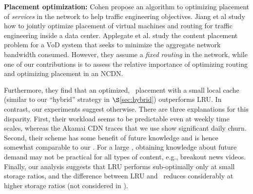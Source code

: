 
\textbf{Placement optimization:} Cohen \cite{serviceplacement} propose an algorithm to optimizing placement of  \emph{services} in the network to help traffic engineering objectives. Jiang et al \cite{vmrouting} study how to jointly optimize placement of virtual machines and routing for traffic engineering inside a data center.
Applegate et al. \cite{Applegate2010} study the content placement problem for a VoD system that seeks to minimize the aggregate network bandwidth consumed. However, they assume a {\em fixed routing} in the network, while one of our contributions is to assess the relative importance of optimizing routing and optimizing  placement in an NCDN.



Furthermore, they find that an optimized, \planned\ placement with a small local cache (similar to our ``hybrid'' strategy in $\S$\ref{sec:hybrid}) outperforms LRU. In contrast, our experiments suggest otherwise. There are three explanations for this disparity. First,  their workload seems to be predictable even at weekly time scales, whereas the Akamai CDN traces that we use show significant daily churn.  Second, their scheme has some benefit  of future knowledge and is hence somewhat comparable to our \optrpfuture. For a large \ncp, obtaining knowledge about future demand may not be practical for all types of content, e.g., breakout news videos. Finally,  our analysis suggests that LRU performs sub-optimally only at small storage ratios,  and the difference between  LRU and \optrpfuture\ reduces considerably at higher storage ratios (not considered in \cite{Applegate2010}).


